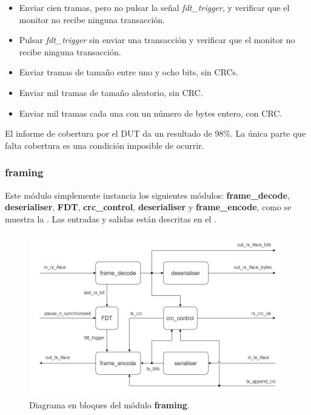 \documentclass[a4paper, twoside, 11pt]{report}
\begin{document}
\begin{itemize}
  \item Enviar cien tramas, pero no pulsar la señal \textit{fdt\_trigger}, y verificar que el monitor no recibe ninguna transacción.
  \item Pulsar \textit{fdt\_trigger} sin enviar una transacción y verificar que el monitor no recibe ninguna transacción.
  \item Enviar tramas de tamaño entre uno y ocho bits, sin CRCs.
  \item Enviar mil tramas de tamaño aleatorio, sin CRC.
  \item Enviar mil tramas cada una con un número de bytes entero, con CRC.
\end{itemize}

El informe de cobertura por el DUT da un resultado de 98\%. La única parte que falta cobertura es una condición imposible de ocurrir.

\FloatBarrier
\subsubsection{framing}

Este módulo simplemente instancia los siguientes módulos: \textbf{frame\_decode}, \textbf{deserialiser}, \textbf{FDT}, \textbf{crc\_control}, \textbf{deserialiser} y \textbf{frame\_encode}, como se muestra la . Las entradas y salidas están descritas en el .

\begin{figure}[htb]
  \centering
  \includegraphics[width=1.0\textwidth]{./img/framing.drawio}
  \caption{Diagrama en bloques del módulo \textbf{framing}.}
  \label{fig:framing}
\end{figure}
\end{document}
